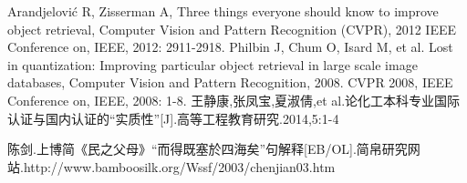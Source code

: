\documentclass{CustGraduPaper}
\begin{document}
%

\begin{thebibliography}{1}%
    
	Arandjelović R, Zisserman A, Three things everyone should know to improve object retrieval, Computer Vision and Pattern Recognition (CVPR), 2012 IEEE Conference on, IEEE, 2012: 2911-2918.  
	Philbin J, Chum O, Isard M, et al. Lost in quantization: Improving particular object retrieval in large scale image databases, Computer Vision and Pattern Recognition, 2008. CVPR 2008, IEEE Conference on, IEEE, 2008: 1-8.  	
	王静康,张凤宝,夏淑倩,et al.论化工本科专业国际认证与国内认证的“实质性”[J].高等工程教育研究.2014,5:1-4

	陈剑.上博简《民之父母》“而得既塞於四海矣”句解释[EB/OL].简帛研究网站.http://www.bamboosilk.org/Wssf/2003/chenjian03.htm
\end{thebibliography}
\end{document}
